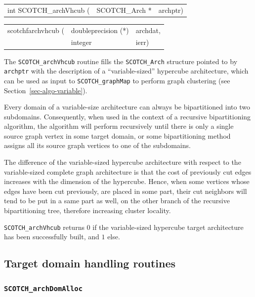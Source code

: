 \begin{itemize}
\progsyn

{\tt\begin{tabular}{l@{}ll}
int SCOTCH\_archVhcub ( & SCOTCH\_Arch * & archptr)
\end{tabular}}

{\tt\begin{tabular}{l@{}ll}
scotchfarchvhcub ( & doubleprecision (*) & archdat, \\
                   & integer             & ierr)
\end{tabular}}

\progdes

The {\tt SCOTCH\_archVhcub} routine fills the {\tt SCOTCH\_\lbt Arch}
structure pointed to by {\tt archptr} with the description of a
``variable-sized'' hypercube architecture, which can be used as
input to {\tt SCOTCH\_\lbt graph\lbt Map} to perform graph clustering
(see Section~\ref{sec-algo-variable}).

Every domain of a variable-size architecture can always be
bipartitioned into two subdomains. Consequently, when used in the
context of a recursive bipartitioning algorithm, the algorithm will
perform recursively until there is only a single source graph vertex
in some target domain, or some bipartitioning method assigns all its
source graph vertices to one of the subdomains.

The difference of the variable-sized hypercube architecture with
respect to the variable-sized complete graph architecture is that the
cost of previously cut edges increases with the dimension of the
hypercube. Hence, when some vertices whose edges have been cut
previously, are placed in some part, their cut neighbors will tend to
be put in a same part as well, on the other branch of the recursive
bipartitioning tree, therefore increasing cluster locality.

\progret

{\tt SCOTCH\_archVhcub} returns $0$ if the variable-sized hypercube
target architecture has been successfully built, and $1$ else.
\end{itemize}

\subsection{Target domain handling routines}
\label{sec-lib-arch-dom-handling}

\subsubsection{{\tt SCOTCH\_archDomAlloc}}

